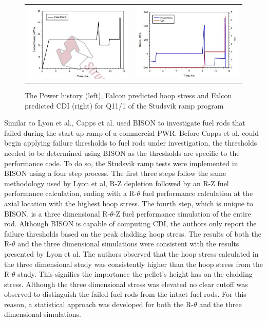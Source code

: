 \documentclass[edeposit,fullpage,11pt]{uiucthesis2009}
\begin{document}
\begin{figure}
\begin{tabular}{cc}
\includegraphics[width=0.5\linewidth]{./Figures/lyon_image_6.JPG} & \includegraphics[width=0.5\linewidth]{./Figures/lyon_image_7.JPG}
\end{tabular}
\caption{The Power history (left), Falcon predicted hoop stress and Falcon predicted CDI (right) for Q11/1 of the Studsvik ramp program \cite{lyon_pci_2009}}
\label{fig:paper_3_res}
\end{figure}


Similar to Lyon et al., Capps et al. \cite{capps_pci_2017} used BISON to investigate fuel rods that failed during the start up ramp of a commercial \gls{PWR}.
Before Capps et al. could begin applying failure thresholds to fuel rods under investigation, the thresholds needed to be determined using BISON as the thresholds are specific to the performance code.
To do so, the Studsvik ramp tests were implemented in BISON using a four step process. %
The first three steps follow the same methodology used by Lyon et al, R-Z depletion followed by an R-Z fuel performance calculation, ending with a R-$\theta$ fuel performance calculation at the axial location with the highest hoop stress.
The fourth step, which is unique to BISON, is a three dimensional R-$\theta$-Z fuel performance simulation of the entire rod. %
Although BISON is capable of computing \gls{CDI}, the authors only report the failure thresholds based on the peak cladding hoop stress.
The results of both the R-$\theta$ and the three dimensional simulations were consistent with the results presented by Lyon et al.
The authors observed that the hoop stress calculated in the three dimensional study was consistently higher than the hoop stress from the R-$\theta$ study.
This signifies the importance the pellet's height has on the cladding stress.
Although the three dimensional stress was elevated no clear cutoff was observed to distinguish the failed fuel rods from the intact fuel rods.
For this reason, a statistical approach was developed for both the R-$\theta$ and the three dimensional simulations.
\end{document}
